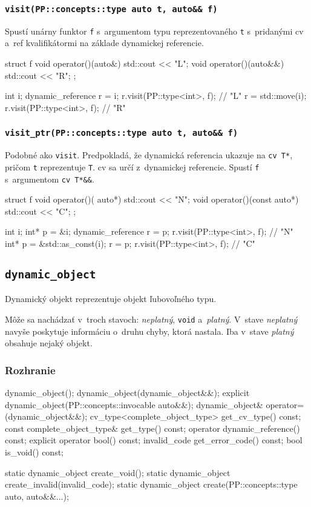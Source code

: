 \subsubsection{\texttt{visit(PP::concepts::type auto t, auto\&\& f)}}

Spustí unárny funktor \texttt{f} s~argumentom typu reprezentovaného \texttt{t} s~pridanými cv a~ref kvalifikátormi na základe dynamickej referencie.
\begin{code}
struct f { void operator()(auto&)  { std::cout << "L"; }
           void operator()(auto&&) { std::cout << "R"; } };

int i;
dynamic_reference r = i;
r.visit(PP::type<int>, f{}); // "L"
r = std::move(i);
r.visit(PP::type<int>, f{}); // "R"
\end{code}

\subsubsection{\texttt{visit\_ptr(PP::concepts::type auto t, auto\&\& f)}}

Podobné ako \texttt{visit}. Predpokladá, že dynamická referencia ukazuje na \texttt{cv T*}, pričom \texttt{t} reprezentuje \texttt{T}. cv sa určí z~dynamickej referencie. Spustí \texttt{f} s~argumentom \texttt{cv T*\&\&}.
\begin{code}
struct f { void operator()(      auto*) { std::cout << "N"; }
           void operator()(const auto*) { std::cout << "C"; } };

int i;
int* p = &i;
dynamic_reference r = p;
r.visit(PP::type<int>, f{}); // "N"
int* p = &std::as_const(i);
r = p;
r.visit(PP::type<int>, f{}); // "C"
\end{code}

\subsection{\texttt{dynamic\_object}}

Dynamický objekt reprezentuje objekt ľubovoľného typu.

Môže sa nachádzať v~troch stavoch: \textit{neplatný}, \texttt{void} a~\textit{platný}. V~stave \textit{neplatný} navyše poskytuje informáciu o~druhu chyby, ktorá nastala. Iba v~stave \textit{platný} obsahuje nejaký objekt.

\subsubsection{Rozhranie}
\begin{code}[fontsize=\footnotesize]
dynamic_object();
dynamic_object(dynamic_object&&);
explicit dynamic_object(PP::concepts::invocable auto&&);
dynamic_object& operator=(dynamic_object&&);
cv_type<complete_object_type> get_cv_type() const;
const complete_object_type& get_type() const;
operator dynamic_reference() const;
explicit operator bool() const;
invalid_code get_error_code() const;
bool is_void() const;

static dynamic_object create_void();
static dynamic_object create_invalid(invalid_code);
static dynamic_object create(PP::concepts::type auto, auto&&...);
\end{code}

